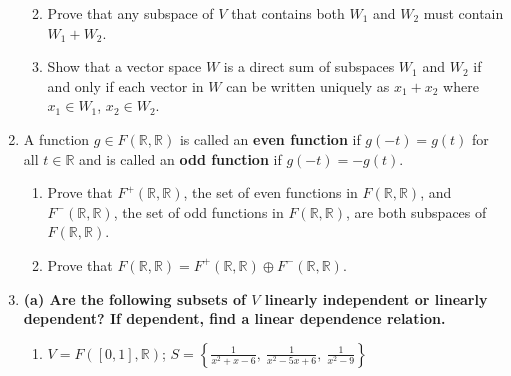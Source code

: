 \documentclass[12pt]{article}
\begin{document}
\begin{enumerate}
\begin{enumerate}[label=(\alph*)]
        \vspace{2in}
        
        \item Prove that any subspace of \( V \) that contains both \( W_1 \) and \( W_2 \) must contain \( W_1 + W_2 \).
        
        \vspace{2in}
        
        \item Show that a vector space \( W \) is a direct sum of subspaces \( W_1 \) and \( W_2 \) if and only if each vector in \( W \) can be written uniquely as \( x_1 + x_2 \) where \( x_1 \in W_1 \), \( x_2 \in W_2 \).
        
        \vspace{2in}
    \end{enumerate}

    \item A function \( g \in F(\mathbb{R}, \mathbb{R}) \) is called an \textbf{even function} if \( g(-t) = g(t) \) for all \( t \in \mathbb{R} \) and is called an \textbf{odd function} if \( g(-t) = -g(t) \).
    \begin{enumerate}[label=(\alph*)]
        \item Prove that \( F^+(\mathbb{R}, \mathbb{R}) \), the set of even functions in \( F(\mathbb{R}, \mathbb{R}) \), and \( F^-(\mathbb{R}, \mathbb{R}) \), the set of odd functions in \( F(\mathbb{R}, \mathbb{R}) \), are both subspaces of \( F(\mathbb{R}, \mathbb{R}) \).
        
        \vspace{2in}
        
        \item Prove that \( F(\mathbb{R}, \mathbb{R}) = F^+(\mathbb{R}, \mathbb{R}) \oplus F^-(\mathbb{R}, \mathbb{R}) \).
        
        \vspace{2in}
    \end{enumerate}

    \item \textbf{(a) Are the following subsets of \( V \) linearly independent or linearly dependent? If dependent, find a linear dependence relation.}
    \begin{enumerate}[label=(i)]
        \item \( V = F([0, 1], \mathbb{R}) \); \( S = \left\{ \frac{1}{x^2 + x - 6}, \ \frac{1}{x^2 - 5x + 6}, \ \frac{1}{x^2 - 9} \right\} \)
        
        \vspace{2in}
        

\end{enumerate}
\end{enumerate}
\end{document}
